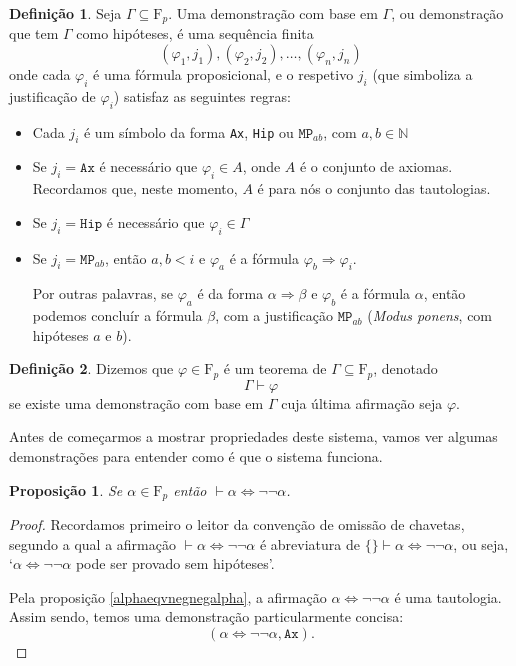 \documentclass{report}
\newtheorem*{prop*}{Proposição}
\theoremstyle{definition}
\newtheorem{definicao}{Definição}
\theoremstyle{remark}
\newcommand{\N}{\mathbb{N}}
\newcommand{\F}{\mathrm{F}}
\newcommand{\imply}{\mathbin{\Rightarrow}}
\newcommand{\eqv}{\mathbin{\Leftrightarrow}}
\begin{document}
	\begin{definicao}
	Seja $\Gamma \subseteq \F_p$. Uma demonstração com base em $\Gamma$, ou demonstração que tem $\Gamma$ como hipóteses, é uma sequência finita
	\[(\varphi_1, j_1), (\varphi_2, j_2), \dots, (\varphi_n, j_n)\]
	onde cada $\varphi_i$ é uma fórmula proposicional, e o respetivo $j_i$ (que simboliza a justificação de $\varphi_i$) satisfaz as seguintes regras:
	
	\begin{itemize}
	\item Cada $j_i$ é um símbolo da forma \texttt{Ax}, \texttt{Hip} ou $\texttt{MP}_{ab}$, com $a,b \in \N$
	
	\item Se $j_i = \texttt{Ax}$ é necessário que $\varphi_i \in A$, onde $A$ é o conjunto de axiomas. Recordamos que, neste momento, $A$ é para nós o conjunto das tautologias.
	
	\item Se $j_i = \texttt{Hip}$ é necessário que $\varphi_i \in \Gamma$
	
	\item Se $j_i = \texttt{MP}_{ab}$, então $a, b < i$ e $\varphi_a$ é a fórmula $\varphi_b \imply \varphi_i$.
	
	Por outras palavras, se $\varphi_a$ é da forma $\alpha \imply \beta$ e $\varphi_b$ é a fórmula $\alpha$, então podemos concluír a fórmula $\beta$, com a justificação $\texttt{MP}_{ab}$ (\textit{Modus ponens}, com hipóteses $a$ e $b$).
	\end{itemize}
	\end{definicao}
	
	\begin{definicao}
	Dizemos que $\varphi \in \F_p$ é um teorema de $\Gamma \subseteq \F_p$, denotado
	\[\Gamma \vdash \varphi\]
	se existe uma demonstração com base em $\Gamma$ cuja última afirmação seja $\varphi$.
	\end{definicao}
	
	Antes de começarmos a mostrar propriedades deste sistema, vamos ver algumas demonstrações para entender como é que o sistema funciona.
	
	\begin{prop*}
	Se $\alpha \in \F_p$ então $\vdash \alpha \eqv \neg \neg \alpha$.
	\end{prop*}
	\begin{proof}
	Recordamos primeiro o leitor da convenção de omissão de chavetas, segundo a qual a afirmação $\vdash \alpha \eqv \neg \neg \alpha$ é abreviatura de $\{\} \vdash \alpha \eqv \neg \neg \alpha$, ou seja, `$\alpha \eqv \neg \neg \alpha$ pode ser provado sem hipóteses'.
	
	Pela proposição \ref{alphaeqvnegnegalpha}, a afirmação $\alpha \eqv \neg \neg \alpha$ é uma tautologia. Assim sendo, temos uma demonstração particularmente concisa:
	\[(\alpha \eqv \neg \neg \alpha, \texttt{Ax}).\]
	\end{proof}
	
\end{document}
